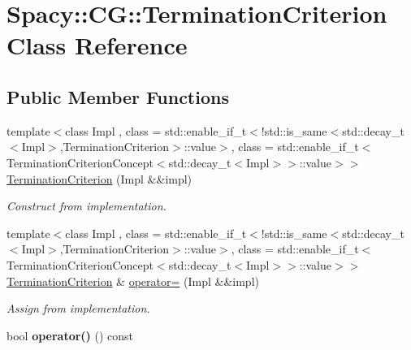 \hypertarget{classSpacy_1_1CG_1_1TerminationCriterion}{}\section{Spacy\+:\+:C\+G\+:\+:Termination\+Criterion Class Reference}
\label{classSpacy_1_1CG_1_1TerminationCriterion}
\subsection*{Public Member Functions}
\begin{DoxyCompactItemize}
\item 
\hypertarget{classSpacy_1_1CG_1_1TerminationCriterion_add8b840783f16e8c1d870adf804fb1f1}{}{\footnotesize template$<$class Impl , class  = std\+::enable\+\_\+if\+\_\+t$<$!std\+::is\+\_\+same$<$std\+::decay\+\_\+t$<$\+Impl$>$,\+Termination\+Criterion$>$\+::value$>$, class  = std\+::enable\+\_\+if\+\_\+t$<$\+Termination\+Criterion\+Concept$<$std\+::decay\+\_\+t$<$\+Impl$>$$>$\+::value$>$$>$ }\\\hyperlink{classSpacy_1_1CG_1_1TerminationCriterion_add8b840783f16e8c1d870adf804fb1f1}{Termination\+Criterion} (Impl \&\&impl)\label{classSpacy_1_1CG_1_1TerminationCriterion_add8b840783f16e8c1d870adf804fb1f1}

\begin{DoxyCompactList}\small\item\em Construct from implementation. \end{DoxyCompactList}\item 
\hypertarget{classSpacy_1_1CG_1_1TerminationCriterion_afb1dd2f02ee9b3ce8b098b87f2ffa5b7}{}{\footnotesize template$<$class Impl , class  = std\+::enable\+\_\+if\+\_\+t$<$!std\+::is\+\_\+same$<$std\+::decay\+\_\+t$<$\+Impl$>$,\+Termination\+Criterion$>$\+::value$>$, class  = std\+::enable\+\_\+if\+\_\+t$<$\+Termination\+Criterion\+Concept$<$std\+::decay\+\_\+t$<$\+Impl$>$$>$\+::value$>$$>$ }\\\hyperlink{classSpacy_1_1CG_1_1TerminationCriterion}{Termination\+Criterion} \& \hyperlink{classSpacy_1_1CG_1_1TerminationCriterion_afb1dd2f02ee9b3ce8b098b87f2ffa5b7}{operator=} (Impl \&\&impl)\label{classSpacy_1_1CG_1_1TerminationCriterion_afb1dd2f02ee9b3ce8b098b87f2ffa5b7}

\begin{DoxyCompactList}\small\item\em Assign from implementation. \end{DoxyCompactList}\item 
\hypertarget{classSpacy_1_1CG_1_1TerminationCriterion_ab109eb287dd3622db54bbbdf0a55660a}{}bool {\bfseries operator()} () const \label{classSpacy_1_1CG_1_1TerminationCriterion_ab109eb287dd3622db54bbbdf0a55660a}


\end{DoxyCompactItemize}
